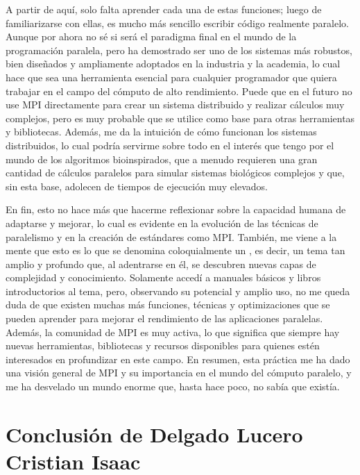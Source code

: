 A partir de aquí, solo falta aprender cada una de estas funciones; luego de familiarizarse con ellas, es mucho más sencillo escribir código realmente paralelo. Aunque por ahora no sé si será el paradigma final en el mundo de la programación paralela, pero ha demostrado ser uno de los sistemas más robustos, bien diseñados y ampliamente adoptados en la industria y la academia, lo cual hace que sea una herramienta esencial para cualquier programador que quiera trabajar en el campo del cómputo de alto rendimiento. Puede que en el futuro no use MPI directamente para crear un sistema distribuido y realizar cálculos muy complejos, pero es muy probable que se utilice como base para otras herramientas y bibliotecas. Además, me da la intuición de cómo funcionan los sistemas distribuidos, lo cual podría servirme sobre todo en el interés que tengo por el mundo de los algoritmos bioinspirados, que a menudo requieren una gran cantidad de cálculos paralelos para simular sistemas biológicos complejos y que, sin esta base, adolecen de tiempos de ejecución muy elevados.

En fin, esto no hace más que hacerme reflexionar sobre la capacidad humana de adaptarse y mejorar, lo cual es evidente en la evolución de las técnicas de paralelismo y en la creación de estándares como MPI. También, me viene a la mente que esto es lo que se denomina coloquialmente un , es decir, un tema tan amplio y profundo que, al adentrarse en él, se descubren nuevas capas de complejidad y conocimiento. Solamente accedí a manuales básicos y libros introductorios al tema, pero, observando su potencial y amplio uso, no me queda duda de que existen muchas más funciones, técnicas y optimizaciones que se pueden aprender para mejorar el rendimiento de las aplicaciones paralelas. Además, la comunidad de MPI es muy activa, lo que significa que siempre hay nuevas herramientas, bibliotecas y recursos disponibles para quienes estén interesados en profundizar en este campo. En resumen, esta práctica me ha dado una visión general de MPI y su importancia en el mundo del cómputo paralelo, y me ha desvelado un mundo enorme que, hasta hace poco, no sabía que existía.

\newpage
\section{Conclusión de Delgado Lucero Cristian Isaac}

